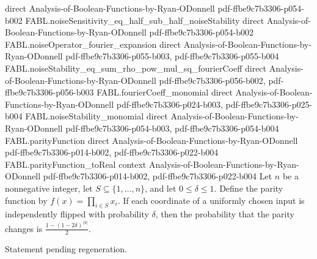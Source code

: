 \begin{theorem}
  {direct}
  {Analysis-of-Boolean-Functions-by-Ryan-ODonnell}
  {pdf-ffbe9c7b3306-p054-b002}
\proofstep
  {FABL.noiseSensitivity_eq_half_sub_half_noiseStability}
  {direct}
  {Analysis-of-Boolean-Functions-by-Ryan-ODonnell}
  {pdf-ffbe9c7b3306-p054-b002}
\proofstep
  {FABL.noiseOperator_fourier_expansion}
  {direct}
  {Analysis-of-Boolean-Functions-by-Ryan-ODonnell}
  {pdf-ffbe9c7b3306-p055-b003,
    pdf-ffbe9c7b3306-p055-b004}
\proofstep
  {FABL.noiseStability_eq_sum_rho_pow_mul_sq_fourierCoeff}
  {direct}
  {Analysis-of-Boolean-Functions-by-Ryan-ODonnell}
  {pdf-ffbe9c7b3306-p056-b002,
    pdf-ffbe9c7b3306-p056-b003}
\proofstep
  {FABL.fourierCoeff_monomial}
  {direct}
  {Analysis-of-Boolean-Functions-by-Ryan-ODonnell}
  {pdf-ffbe9c7b3306-p024-b003,
    pdf-ffbe9c7b3306-p025-b004}
\proofstep
  {FABL.noiseStability_monomial}
  {direct}
  {Analysis-of-Boolean-Functions-by-Ryan-ODonnell}
  {pdf-ffbe9c7b3306-p054-b003,
    pdf-ffbe9c7b3306-p054-b004}
\proofstep
  {FABL.parityFunction}
  {direct}
  {Analysis-of-Boolean-Functions-by-Ryan-ODonnell}
  {pdf-ffbe9c7b3306-p014-b002,
    pdf-ffbe9c7b3306-p022-b004}
\proofstep
  {FABL.parityFunction_toReal}
  {context}
  {Analysis-of-Boolean-Functions-by-Ryan-ODonnell}
  {pdf-ffbe9c7b3306-p014-b002,
    pdf-ffbe9c7b3306-p022-b004}
Let $n$ be a nonnegative integer, let $S\subseteq\{1,\ldots,n\}$, and let
$0\leq\delta\leq1$. Define the parity function by $f(x)=\prod_{i\in S}x_i$. If each
coordinate of a uniformly chosen input is independently flipped with probability
$\delta$, then the probability that the parity changes is
$\frac{1-(1-2\delta)^{|S|}}{2}$.
\end{theorem}

\begin{theorem}
\label{FABL.noiseStability_dictator}
\leanok
{}
Statement pending regeneration.
\end{theorem}

